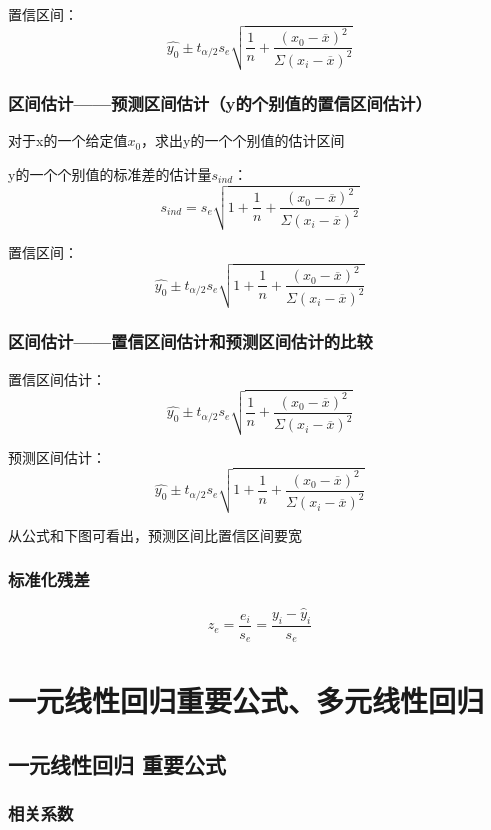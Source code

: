 \documentclass[UTF8,10pt]{book}
\begin{document}
{置信区间： 
$$ \hat{y_0} \pm t_{\alpha / 2} s_e \sqrt{ \frac{1}{n} + \frac{(x_0 - \overline{x})^2}{\Sigma (x_i - \overline{x})^2}} $$

\subsection{区间估计——预测区间估计（y的个别值的置信区间估计）}	
对于x的一个给定值$x_0$，求出y的一个个别值的估计区间 

y的一个个别值的标准差的估计量$s_{ind}$： 
$$ s_{ind} = s_e \sqrt{1+\frac{1}{n} + \frac{(x_0 - \overline{x})^2}{\Sigma (x_i - \overline{x})^2}} $$ 

置信区间： 
$$ \hat{y_0} \pm t_{\alpha / 2} s_e \sqrt{1+ \frac{1}{n} + \frac{(x_0 - \overline{x})^2}{\Sigma (x_i - \overline{x})^2}} $$

\subsection{区间估计——置信区间估计和预测区间估计的比较}	

置信区间估计： 
$$ \hat{y_0} \pm t_{\alpha / 2} s_e \sqrt{ \frac{1}{n} + \frac{(x_0 - \overline{x})^2}{\Sigma (x_i - \overline{x})^2}} $$ 

预测区间估计： 
$$ \hat{y_0} \pm t_{\alpha / 2} s_e \sqrt{1+ \frac{1}{n} + \frac{(x_0 - \overline{x})^2}{\Sigma (x_i - \overline{x})^2}} $$ 

从公式和下图可看出，预测区间比置信区间要宽

\subsection{标准化残差}	
$$ z_e = \frac{e_i}{s_e}= \frac{y_i - \hat{y}_i}{s_e} $$

\clearpage

\chapter{一元线性回归重要公式、多元线性回归}



\section{一元线性回归 重要公式}\label{header-n55}

\subsection{相关系数}\label{header-n56}

}
\end{document}
